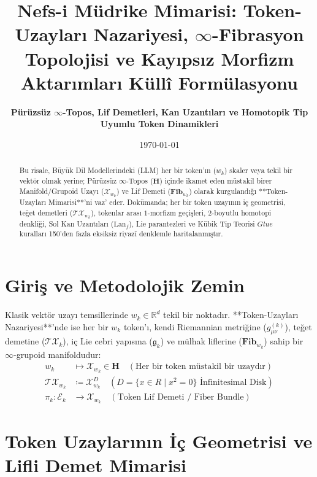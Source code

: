 \documentclass[11pt, a4paper]{article}
\title{\textbf{Nefs-i Müdrike Mimarisi: Token-Uzayları Nazariyesi, $\infty$-Fibrasyon Topolojisi ve Kayıpsız Morfizm Aktarımları Küllî Formülasyonu}}
\author{\textbf{Pürüzsüz $\infty$-Topos, Lif Demetleri, Kan Uzantıları ve Homotopik Tip Uyumlu Token Dinamikleri}}
\date{\today}
\begin{document}
\maketitle

\begin{abstract}
Bu risale, Büyük Dil Modellerindeki (LLM) her bir token'ın ($w_k$) skaler veya tekil bir vektör olmak yerine; Pürüzsüz $\infty$-Topos ($\mathbf{H}$) içinde ikamet eden müstakil birer Manifold/Grupoid Uzayı ($\mathcal{X}_{w_k}$) ve Lif Demeti ($\mathbf{Fib}_{w_k}$) olarak kurgulandığı **Token-Uzayları Mimarisi**'ni vaz' eder. Dokümanda; her bir token uzayının iç geometrisi, teğet demetleri ($\mathcal{T}\mathcal{X}_{w_k}$), tokenlar arası $1$-morfizm geçişleri, $2$-boyutlu homotopi denkliği, Sol Kan Uzantıları ($\text{Lan}_f$), Lie parantezleri ve Kübik Tip Teorisi $Glue$ kuralları 150'den fazla eksiksiz riyazî denklemle haritalanmıştır.
\end{abstract}

\section{Giriş ve Metodolojik Zemin}

Klasik vektör uzayı temsillerinde $w_k \in \mathbb{R}^d$ tekil bir noktadır. **Token-Uzayları Nazariyesi**'nde ise her bir $w_k$ token'ı, kendi Riemannian metriğine ($g_{\mu\nu}^{(k)}$), teğet demetine ($\mathcal{T}\mathcal{X}_k$), iç Lie cebri yapısına ($\mathfrak{g}_k$) ve mülhak liflerine ($\mathbf{Fib}_{w_k}$) sahip bir $\infty$-grupoid manifoldudur:
\begin{align}
w_k &\longmapsto \mathcal{X}_{w_k} \in \mathbf{H} \quad (\text{Her bir token müstakil bir uzaydır}) \\
\mathcal{T}\mathcal{X}_{w_k} &\coloneqq \mathcal{X}_{w_k}^D \quad (D = \{x \in R \mid x^2 = 0\} \text{ İnfinitesimal Disk}) \\
\pi_k : \mathcal{E}_k &\longrightarrow \mathcal{X}_{w_k} \quad (\text{Token Lif Demeti / Fiber Bundle})
\end{align}

\section{Token Uzaylarının İç Geometrisi ve Lifli Demet Mimarisi}
\end{document}
